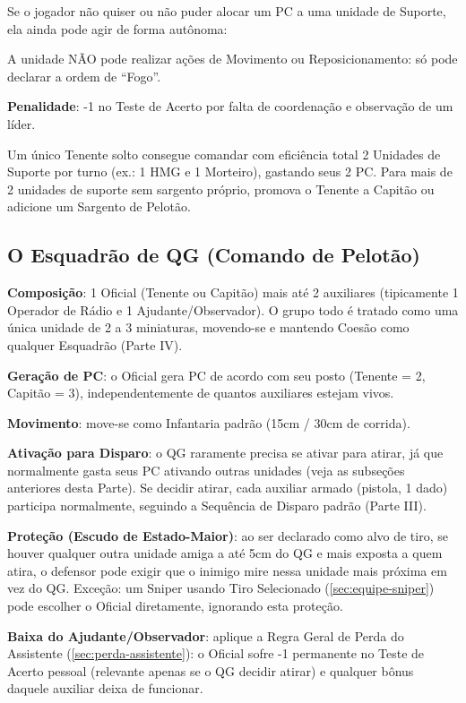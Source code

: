 Se o jogador não quiser ou não puder alocar um PC a uma unidade de Suporte, ela ainda pode agir de forma autônoma:

A unidade NÃO pode realizar ações de Movimento ou Reposicionamento: só pode declarar a ordem de ``Fogo''.

\textbf{Penalidade}: -1 no Teste de Acerto por falta de coordenação e observação de um líder.

\begin{nota}
Um único Tenente solto consegue comandar com eficiência total 2 Unidades de Suporte por turno (ex.: 1 HMG e 1 Morteiro), gastando seus 2 PC. Para mais de 2 unidades de suporte sem sargento próprio, promova o Tenente a Capitão ou adicione um Sargento de Pelotão.
\end{nota}

\subsection{O Esquadrão de QG (Comando de Pelotão)}
\label{sec:qg-pelotao}

\textbf{Composição}: 1 Oficial (Tenente ou Capitão) mais até 2 auxiliares (tipicamente 1 Operador de Rádio e 1 Ajudante/Observador). O grupo todo é tratado como uma única unidade de 2 a 3 miniaturas, movendo-se e mantendo Coesão como qualquer Esquadrão (Parte IV).

\textbf{Geração de PC}: o Oficial gera PC de acordo com seu posto (Tenente = 2, Capitão = 3), independentemente de quantos auxiliares estejam vivos.

\textbf{Movimento}: move-se como Infantaria padrão (15cm / 30cm de corrida).

\textbf{Ativação para Disparo}: o QG raramente precisa se ativar para atirar, já que normalmente gasta seus PC ativando outras unidades (veja as subseções anteriores desta Parte). Se decidir atirar, cada auxiliar armado (pistola, 1 dado) participa normalmente, seguindo a Sequência de Disparo padrão (Parte III).

\textbf{Proteção (Escudo de Estado-Maior)}: ao ser declarado como alvo de tiro, se houver qualquer outra unidade amiga a até 5cm do QG e mais exposta a quem atira, o defensor pode exigir que o inimigo mire nessa unidade mais próxima em vez do QG. Exceção: um Sniper usando Tiro Selecionado (\ref{sec:equipe-sniper}) pode escolher o Oficial diretamente, ignorando esta proteção.

\textbf{Baixa do Ajudante/Observador}: aplique a Regra Geral de Perda do Assistente (\ref{sec:perda-assistente}): o Oficial sofre -1 permanente no Teste de Acerto pessoal (relevante apenas se o QG decidir atirar) e qualquer bônus daquele auxiliar deixa de funcionar.

